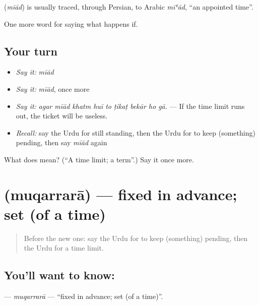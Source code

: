 \begin{cousinweb}
\textbf{} (\emph{mīād}) is usually traced, through Persian, to Arabic \emph{mīʿād}, \textquotedblleft{}an appointed time\textquotedblright{}.
\end{cousinweb}

\begin{grammarlens}[title={What you've built}]
One more word for saying what happens if.
\end{grammarlens}

\subsection*{Your turn}
\begin{itemize}
\raggedright
  \item \emph{Say it:} \emph{mīād}
  \item \emph{Say it:} \emph{mīād}, once more
  \item \emph{Say it:} \emph{agar mīād khatm huī to ṭikaṭ bekār ho gā.} — If the time limit runs out, the ticket will be useless.
  \item \emph{Recall:} say the Urdu for still standing, then the Urdu for to keep (something) pending, then say \emph{mīād} again
\end{itemize}

\begin{tcolorbox}[breakable,colback=teal!4,colframe=teal!35!black,title={Before you move on}]
What does  mean? (\textquotedblleft{}A time limit; a term\textquotedblright{}.) Say it once more.
\end{tcolorbox}
\section[\texorpdfstring{\ur{مقررہ} (muqarrarā)}{مقررہ (muqarrarā)}]{ (muqarrarā) — fixed in advance; set (of a time)}

\label{lesson:UR-C526-muqarrara}



\begin{quote}
Before the new one: say the Urdu for to keep (something) pending, then the Urdu for a time limit.
\end{quote}

\subsection*{You'll want to know: }
\textbf{} — \emph{muqarrarā} — \textquotedblleft{}fixed in advance; set (of a time)\textquotedblright{}.

